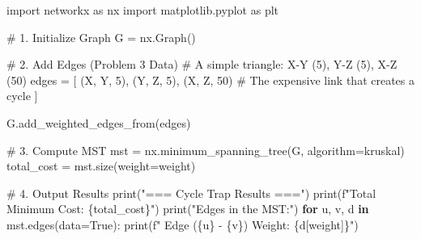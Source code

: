 \documentclass[
  letterpaper,
  DIV=11,
  numbers=noendperiod]{scrreprt}
\newenvironment{Shaded}{\begin{snugshade}}{\end{snugshade}}
\newcommand{\BuiltInTok}[1]{\textcolor[rgb]{0.00,0.23,0.31}{#1}}
\newcommand{\CommentTok}[1]{\textcolor[rgb]{0.37,0.37,0.37}{#1}}
\newcommand{\ControlFlowTok}[1]{\textcolor[rgb]{0.00,0.23,0.31}{\textbf{#1}}}
\newcommand{\DecValTok}[1]{\textcolor[rgb]{0.68,0.00,0.00}{#1}}
\newcommand{\ImportTok}[1]{\textcolor[rgb]{0.00,0.46,0.62}{#1}}
\newcommand{\KeywordTok}[1]{\textcolor[rgb]{0.00,0.23,0.31}{\textbf{#1}}}
\newcommand{\NormalTok}[1]{\textcolor[rgb]{0.00,0.23,0.31}{#1}}
\newcommand{\OperatorTok}[1]{\textcolor[rgb]{0.37,0.37,0.37}{#1}}
\newcommand{\SpecialCharTok}[1]{\textcolor[rgb]{0.37,0.37,0.37}{#1}}
\newcommand{\SpecialStringTok}[1]{\textcolor[rgb]{0.13,0.47,0.30}{#1}}
\newcommand{\StringTok}[1]{\textcolor[rgb]{0.13,0.47,0.30}{#1}}
\newcommand{\VariableTok}[1]{\textcolor[rgb]{0.07,0.07,0.07}{#1}}
\begin{document}
\begin{Shaded}
\begin{Highlighting}[]
\ImportTok{import}\NormalTok{ networkx }\ImportTok{as}\NormalTok{ nx}
\ImportTok{import}\NormalTok{ matplotlib.pyplot }\ImportTok{as}\NormalTok{ plt}

\CommentTok{\# 1. Initialize Graph}
\NormalTok{G }\OperatorTok{=}\NormalTok{ nx.Graph()}

\CommentTok{\# 2. Add Edges (Problem 3 Data)}
\CommentTok{\# A simple triangle: X{-}Y (5), Y{-}Z (5), X{-}Z (50)}
\NormalTok{edges }\OperatorTok{=}\NormalTok{ [}
\NormalTok{    (}\StringTok{\textquotesingle{}X\textquotesingle{}}\NormalTok{, }\StringTok{\textquotesingle{}Y\textquotesingle{}}\NormalTok{, }\DecValTok{5}\NormalTok{),}
\NormalTok{    (}\StringTok{\textquotesingle{}Y\textquotesingle{}}\NormalTok{, }\StringTok{\textquotesingle{}Z\textquotesingle{}}\NormalTok{, }\DecValTok{5}\NormalTok{),}
\NormalTok{    (}\StringTok{\textquotesingle{}X\textquotesingle{}}\NormalTok{, }\StringTok{\textquotesingle{}Z\textquotesingle{}}\NormalTok{, }\DecValTok{50}\NormalTok{)  }\CommentTok{\# The expensive link that creates a cycle}
\NormalTok{]}

\NormalTok{G.add\_weighted\_edges\_from(edges)}

\CommentTok{\# 3. Compute MST}
\NormalTok{mst }\OperatorTok{=}\NormalTok{ nx.minimum\_spanning\_tree(G, algorithm}\OperatorTok{=}\StringTok{\textquotesingle{}kruskal\textquotesingle{}}\NormalTok{)}
\NormalTok{total\_cost }\OperatorTok{=}\NormalTok{ mst.size(weight}\OperatorTok{=}\StringTok{\textquotesingle{}weight\textquotesingle{}}\NormalTok{)}

\CommentTok{\# 4. Output Results}
\BuiltInTok{print}\NormalTok{(}\StringTok{"=== Cycle Trap Results ==="}\NormalTok{)}
\BuiltInTok{print}\NormalTok{(}\SpecialStringTok{f"Total Minimum Cost: }\SpecialCharTok{\{}\NormalTok{total\_cost}\SpecialCharTok{\}}\SpecialStringTok{"}\NormalTok{)}
\BuiltInTok{print}\NormalTok{(}\StringTok{"Edges in the MST:"}\NormalTok{)}
\ControlFlowTok{for}\NormalTok{ u, v, d }\KeywordTok{in}\NormalTok{ mst.edges(data}\OperatorTok{=}\VariableTok{True}\NormalTok{):}
    \BuiltInTok{print}\NormalTok{(}\SpecialStringTok{f"  Edge (}\SpecialCharTok{\{}\NormalTok{u}\SpecialCharTok{\}}\SpecialStringTok{ {-} }\SpecialCharTok{\{}\NormalTok{v}\SpecialCharTok{\}}\SpecialStringTok{) Weight: }\SpecialCharTok{\{}\NormalTok{d[}\StringTok{\textquotesingle{}weight\textquotesingle{}}\NormalTok{]}\SpecialCharTok{\}}\SpecialStringTok{"}\NormalTok{)}


\end{Highlighting}
\end{Shaded}
\end{document}
